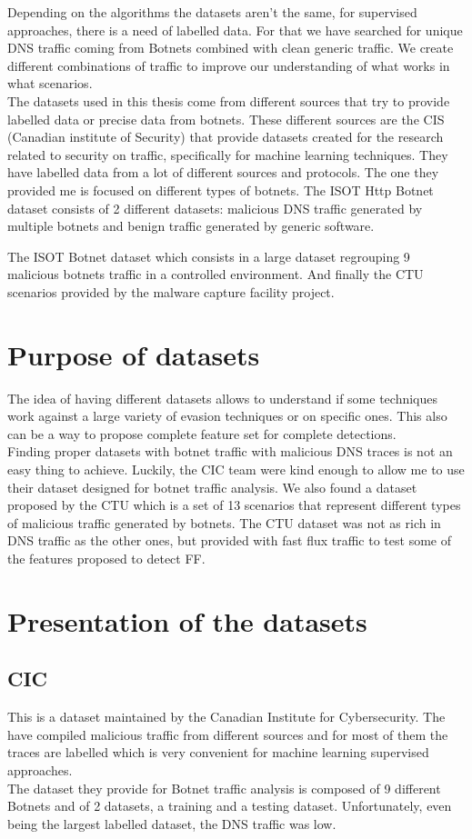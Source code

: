 Depending on the algorithms the datasets aren't the same, for supervised approaches, there is a need of labelled data. For that we have searched for unique DNS traffic coming from Botnets combined with clean generic traffic. We create different combinations of traffic to improve our understanding of what works in what scenarios.\\


The datasets used in this thesis come from different sources that try to provide labelled data or precise data from botnets. These different sources are the CIS (Canadian institute of Security) that provide datasets created for the research related to security on traffic, specifically for machine learning techniques. They have labelled data from a lot of different sources and protocols. The one they provided me is focused on different types of botnets.
The ISOT Http Botnet dataset consists of 2 different datasets: malicious DNS traffic generated by multiple botnets and benign traffic generated by generic software. 

The ISOT Botnet dataset which consists in a large dataset regrouping 9 malicious botnets traffic in a controlled environment. 
And finally the CTU scenarios provided by the malware capture facility project.

\section{Purpose of datasets}
The idea of having different datasets allows to understand if some techniques work against a large variety of evasion techniques or on specific ones. This also can be a way to propose complete feature set for complete detections.
\\
Finding proper datasets with botnet traffic with malicious DNS traces is not an easy thing to achieve. Luckily, the CIC team were kind enough to allow me to use their dataset designed for botnet traffic analysis. We also found a dataset proposed by the CTU which is a set of 13 scenarios that represent different types of malicious traffic generated by botnets. The CTU dataset was not as rich in DNS traffic as the other ones, but provided with fast flux traffic to test some of the features proposed to detect FF.

\section{Presentation of the datasets}
\subsection{CIC}
This is a dataset maintained by the Canadian Institute for Cybersecurity. The have compiled malicious traffic from different sources and for most of them the traces are labelled which is very convenient for machine learning supervised approaches.\\ 
The dataset they provide for Botnet traffic analysis is composed of 9 different Botnets and of 2 datasets, a training and a testing dataset. Unfortunately, even being the largest labelled  dataset, the DNS traffic was low. 
